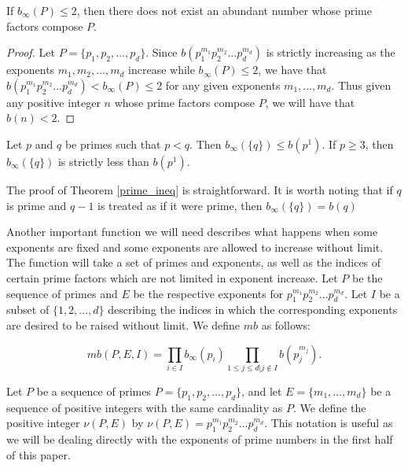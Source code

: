 \documentclass[../paper.tex]{article}
\begin{document}
\begin{theorem} \label{b_inf_n!}
If $b_{\infty}(P) \leq 2$, then there does not exist an abundant
number whose prime factors compose $P$.
\end{theorem}

\begin{proof}
Let $P = \{p_1, p_2, ..., p_d\}$.
Since $b(p_1^{m_1} p_2^{m_2} ... p_d^{m_d})$ is strictly increasing as the
exponents $m_1, m_2, ..., m_d$ increase while $b_{\infty}(P) \leq
2$, we have that $b(p_1^{m_1} p_2^{m_2} ... p_d^{m_d}) < 
b_{\infty}(P) \leq 2$ for any given exponents $m_1, ..., m_d$. 
Thus given any positive integer $n$ whose prime factors compose
$P$, we will have that $b(n) < 2$.
\end{proof}

\begin{theorem} \label{prime_ineq}
Let $p$ and $q$ be primes such that $p < q$. Then $b_\infty(\{q\})
\leq b(p^1)$. If $p \geq 3$, then $b_{\infty}(\{q\})$ is strictly
less than $b(p^1)$.
\end{theorem}

The proof of Theorem \ref{prime_ineq} is straightforward. It is worth noting that if $q$ is 
prime and $q - 1$ is treated as if it were prime, then $b_\infty(\{q\}) = b(q)$ 

Another important function we will need describes what happens 
when some exponents are fixed and some exponents are allowed to
increase without limit. 
The function will take a set of primes and exponents,
as well as the indices of certain prime factors which are not
limited in exponent increase. Let $P$ be the sequence of primes 
and $E$ be the respective exponents for 
$p_1^{m_1} p_2^{m_2} ... p_d^{m_d}$. Let $I$ be a subset of
$\{1, 2, ..., d\}$ describing the indices in which the corresponding
exponents are desired to be raised without limit. We define $mb$ as 
follows:

\begin{equation}\label{mb_def}
  mb(P,E,I) = \prod_{i \in I} b_{\infty}(p_i) 
  \prod_{1 \leq j \leq d | j \notin I} b(p_j^{m_j}).
\end{equation}


Let $P$ be a sequence of primes $P = \{p_1, p_2, ..., p_d\}$,
and let $E = \{m_1, ..., m_d\}$ be a sequence of positive integers
with the same cardinality as $P$. We define the positive integer 
$\nu(P,E)$ by $\nu(P,E) = p_1^{m_1} p_2^{m_2} ... p_d^{m_d}$. 
This notation is useful as we will be dealing directly with
the exponents of prime numbers in the first half of this paper.
\end{document}
